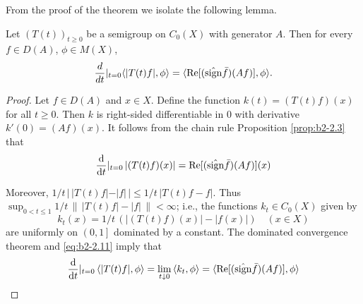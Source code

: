 From the proof of the theorem we isolate the following lemma.

\begin{lemma}\label{lem:b2-2.6}
Let $(T(t))_{t \geq 0}$ be a semigroup on $C_{0}(X)$ with generator $A$.
Then for every $f \in D(A)$, $\phi \in M(X)$,
\begin{equation}\label{eq:b2-2.10}
\frac{d}{dt}
|_{t = 0} \langle |T(t)f|,\phi \rangle = \langle \mathop{}\!\mathrm{Re}[(\hat{\operatorname{sign}} \bar{f})(Af)],\phi \rangle.
\end{equation}
\end{lemma}

\begin{proof}
Let $f \in D(A)$ and $x \in X$.
Define the function $k(t) = (T(t)f)(x)$ for all $t \geq 0$.
Then $k$ is right-sided differentiable in $0$ with derivative $k'(0) = (Af)(x)$.
It follows from the chain rule Proposition \ref{prop:b2-2.3} that
\begin{equation}\label{eq:b2-2.11}
\frac{\mathop{}\!\mathrm{d}{}}{\mathop{}\!\mathrm{d}{t}}
|_{t = 0}\, |(T(t)f)(x)| = \mathop{}\!\mathrm{Re}[(\hat{\operatorname{sign}} \bar{f})(Af)](x)
\end{equation}

Moreover, $1/t\, |\, |T(t)f| - |f| \, | \leq 1/t\, |T(t)f - f|$.
Thus $\sup_{0 < t \leq 1} 1/t\, \|\, |T(t)f| - |f|\, \| < \infty$; i.e., the functions $k_{t} \in C_{0}(X)$ given by
\begin{equation}\label{eq:b2-2.12}
k_{t}(x) = 1/t\,(|(T(t)f)(x)| - |f(x)|) \quad (x \in X)
\end{equation}
are uniformly on $\left(0,1\right]$ dominated by a constant.
The dominated convergence theorem and \eqref{eq:b2-2.11} imply that
\begin{align*}
\frac{\mathop{}\!\mathrm{d}{}}{\mathop{}\!\mathrm{d}{t}}|_{t=0}\, \langle |T(t)f|,\phi \rangle = \lim_{t \downarrow 0}\, \langle k_{t},\phi \rangle = \langle \mathop{}\!\mathrm{Re}[(\hat{\operatorname{sign}} \bar{f})(Af)],\phi \rangle
\end{align*}
\end{proof}

